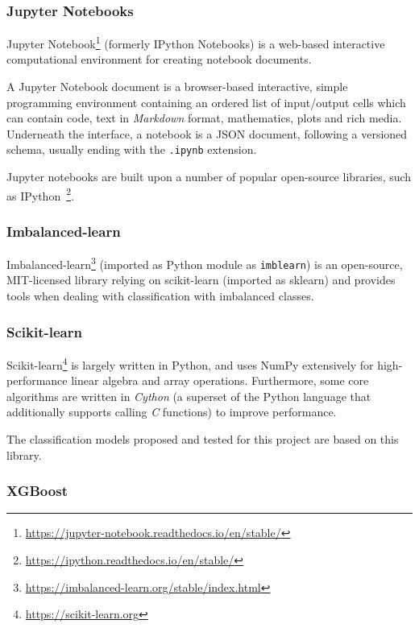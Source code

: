 \documentclass[a4paper, 12pt]{book}
\begin{document}
\subsubsection{Jupyter Notebooks}
\label{sssec:jupyter-notebooks}

Jupyter Notebook\footnote{\url{https://jupyter-notebook.readthedocs.io/en/stable/}} (formerly IPython Notebooks) is a web-based interactive computational environment for creating notebook documents.

A Jupyter Notebook document is a browser-based interactive, simple programming environment containing an ordered list of input/output cells which can contain code, text in \emph{Markdown} format, mathematics, plots and rich media. Underneath the interface, a notebook is a JSON document, following a versioned schema, usually ending with the \texttt{.ipynb} extension.

Jupyter notebooks are built upon a number of popular open-source libraries, such as IPython~\footnote{\url{https://ipython.readthedocs.io/en/stable/}}.

\subsubsection{Imbalanced-learn}
\label{sssec:imblearn}

Imbalanced-learn\footnote{\url{https://imbalanced-learn.org/stable/index.html}} (imported as Python module as \texttt{imblearn}) is an open-source, MIT-licensed library relying on scikit-learn (imported as sklearn) and provides tools when dealing with classification with imbalanced classes.

\subsubsection{Scikit-learn}
\label{sssec:scikit-learn}

Scikit-learn\footnote{\url{https://scikit-learn.org}} is largely written in Python, and uses NumPy extensively for high-performance linear algebra and array operations. Furthermore, some core algorithms are written in \emph{Cython} (a superset of the Python language that additionally supports calling \emph{C} functions) to improve performance.

The classification models proposed and tested for this project are based on this library. 

\subsubsection{XGBoost}
\label{sssec:state-art-xgboost}
\end{document}
